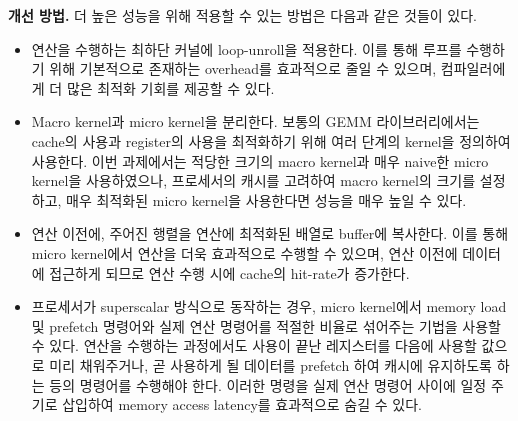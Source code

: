 \begin{itemize}
{        \textbf{개선 방법.}
        더 높은 성능을 위해 적용할 수 있는 방법은 다음과 같은 것들이 있다.
        \begin{itemize}
            \item {
                연산을 수행하는 최하단 커널에 loop-unroll을 적용한다. 이를 통해 루프를 수행하기 위해
                기본적으로 존재하는 overhead를 효과적으로 줄일 수 있으며, 컴파일러에게 더 많은
                최적화 기회를 제공할 수 있다.
            }
            \item {
                Macro kernel과 micro kernel을 분리한다. 보통의 GEMM 라이브러리에서는 cache의 사용과
                register의 사용을 최적화하기 위해 여러 단계의 kernel을 정의하여 사용한다.
                이번 과제에서는 적당한 크기의 macro kernel과 매우 naive한 micro kernel을
                사용하였으나, 프로세서의 캐시를 고려하여 macro kernel의 크기를 설정하고,
                매우 최적화된 micro kernel을 사용한다면 성능을 매우 높일 수 있다.
            }
            \item {
                연산 이전에, 주어진 행렬을 연산에 최적화된 배열로 buffer에 복사한다.
                이를 통해 micro kernel에서 연산을 더욱 효과적으로 수행할 수 있으며,
                연산 이전에 데이터에 접근하게 되므로 연산 수행 시에 cache의 hit-rate가 증가한다.
            }
            \item {
                프로세서가 superscalar 방식으로 동작하는 경우, micro kernel에서 memory load 및
                prefetch 명령어와 실제 연산 명령어를 적절한 비율로 섞어주는 기법을 사용할 수 있다.
                연산을 수행하는 과정에서도 사용이 끝난 레지스터를 다음에 사용할 값으로 미리 채워주거나,
                곧 사용하게 될 데이터를 prefetch 하여 캐시에 유지하도록 하는 등의 명령어를 수행해야 한다.
                이러한 명령을 실제 연산 명령어 사이에 일정 주기로 삽입하여 memory access latency를
                효과적으로 숨길 수 있다.
            }
        \end{itemize}
        
    }
    
\end{itemize}